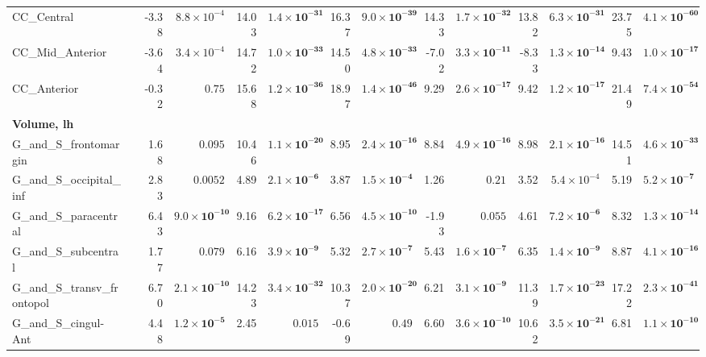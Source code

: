 {\begin{longtable}{llrrrrrrrrrrrr}
CC\_Central &  & -3.38 & $8.8{\times}10^{-4}$ & 14.03 & $\mathbf{1.4{\times}10^{-31}}$ & 16.37 & $\mathbf{9.0{\times}10^{-39}}$ & 14.33 & $\mathbf{1.7{\times}10^{-32}}$ & 13.82 & $\mathbf{6.3{\times}10^{-31}}$ & 23.75 & $\mathbf{4.1{\times}10^{-60}}$ \\
CC\_Mid\_Anterior &  & -3.64 & $3.4{\times}10^{-4}$ & 14.72 & $\mathbf{1.0{\times}10^{-33}}$ & 14.50 & $\mathbf{4.8{\times}10^{-33}}$ & -7.02 & $\mathbf{3.3{\times}10^{-11}}$ & -8.33 & $\mathbf{1.3{\times}10^{-14}}$ & 9.43 & $\mathbf{1.0{\times}10^{-17}}$ \\
CC\_Anterior &  & -0.32 & $0.75$ & 15.68 & $\mathbf{1.2{\times}10^{-36}}$ & 18.97 & $\mathbf{1.4{\times}10^{-46}}$ & 9.29 & $\mathbf{2.6{\times}10^{-17}}$ & 9.42 & $\mathbf{1.2{\times}10^{-17}}$ & 21.49 & $\mathbf{7.4{\times}10^{-54}}$ \\
\midrule\multicolumn{14}{l}{\textbf{Volume, lh}} \\
G\_and\_S\_frontomargin &  & 1.68 & $0.095$ & 10.46 & $\mathbf{1.1{\times}10^{-20}}$ & 8.95 & $\mathbf{2.4{\times}10^{-16}}$ & 8.84 & $\mathbf{4.9{\times}10^{-16}}$ & 8.98 & $\mathbf{2.1{\times}10^{-16}}$ & 14.51 & $\mathbf{4.6{\times}10^{-33}}$ \\
G\_and\_S\_occipital\_inf &  & 2.83 & $0.0052$ & 4.89 & $\mathbf{2.1{\times}10^{-6}}$ & 3.87 & $\mathbf{1.5{\times}10^{-4}}$ & 1.26 & $0.21$ & 3.52 & $5.4{\times}10^{-4}$ & 5.19 & $\mathbf{5.2{\times}10^{-7}}$ \\
G\_and\_S\_paracentral &  & 6.43 & $\mathbf{9.0{\times}10^{-10}}$ & 9.16 & $\mathbf{6.2{\times}10^{-17}}$ & 6.56 & $\mathbf{4.5{\times}10^{-10}}$ & -1.93 & $0.055$ & 4.61 & $\mathbf{7.2{\times}10^{-6}}$ & 8.32 & $\mathbf{1.3{\times}10^{-14}}$ \\
G\_and\_S\_subcentral &  & 1.77 & $0.079$ & 6.16 & $\mathbf{3.9{\times}10^{-9}}$ & 5.32 & $\mathbf{2.7{\times}10^{-7}}$ & 5.43 & $\mathbf{1.6{\times}10^{-7}}$ & 6.35 & $\mathbf{1.4{\times}10^{-9}}$ & 8.87 & $\mathbf{4.1{\times}10^{-16}}$ \\
G\_and\_S\_transv\_frontopol &  & 6.70 & $\mathbf{2.1{\times}10^{-10}}$ & 14.23 & $\mathbf{3.4{\times}10^{-32}}$ & 10.37 & $\mathbf{2.0{\times}10^{-20}}$ & 6.21 & $\mathbf{3.1{\times}10^{-9}}$ & 11.39 & $\mathbf{1.7{\times}10^{-23}}$ & 17.22 & $\mathbf{2.3{\times}10^{-41}}$ \\
G\_and\_S\_cingul-Ant &  & 4.48 & $\mathbf{1.2{\times}10^{-5}}$ & 2.45 & $0.015$ & -0.69 & $0.49$ & 6.60 & $\mathbf{3.6{\times}10^{-10}}$ & 10.62 & $\mathbf{3.5{\times}10^{-21}}$ & 6.81 & $\mathbf{1.1{\times}10^{-10}}$ \\

\end{longtable}}

